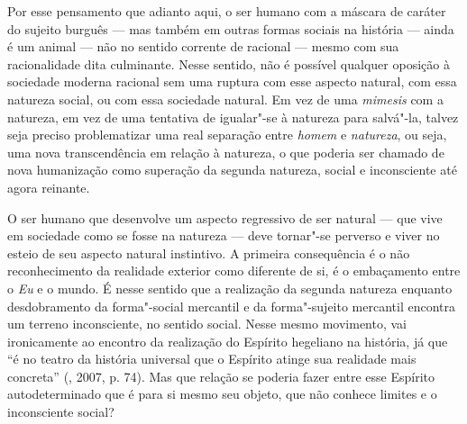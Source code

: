 Por esse pensamento que adianto aqui, o ser humano com a máscara de
caráter do sujeito burguês --- mas também em outras formas sociais na
história --- ainda é um animal --- não no sentido corrente de racional ---
mesmo com sua racionalidade dita culminante. Nesse sentido, não é
possível qualquer oposição à sociedade moderna racional sem uma ruptura
com esse aspecto natural, com essa natureza social, ou com essa
sociedade natural. Em vez de uma \emph{mimesis} com a natureza, em vez
de uma tentativa de igualar"-se à natureza para salvá"-la, talvez seja
preciso problematizar uma real separação entre \emph{homem} e
\emph{natureza}, ou seja, uma nova transcendência em relação à natureza,
o que poderia ser chamado de nova humanização como superação da segunda
natureza, social e inconsciente até agora reinante.

O ser humano que desenvolve um aspecto regressivo de ser natural --- que
vive em sociedade como se fosse na natureza --- deve tornar"-se perverso e
viver no esteio de seu aspecto natural instintivo. A primeira
consequência é o não reconhecimento da realidade exterior como diferente
de si, é o embaçamento entre o \emph{Eu} e o mundo. É nesse sentido que
a realização da segunda natureza enquanto desdobramento da forma"-social
mercantil e da forma"-sujeito mercantil encontra um terreno inconsciente,
no sentido social. Nesse mesmo movimento, vai ironicamente ao encontro
da realização do Espírito hegeliano na história, já que ``é no teatro da
história universal que o Espírito atinge sua realidade mais concreta''
(, 2007, p. 74). Mas que relação se poderia fazer entre esse
Espírito autodeterminado que é para si mesmo seu objeto, que não conhece
limites e o inconsciente social?

